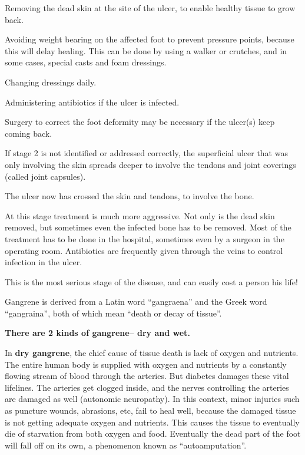 {\item Removing the dead skin at the site of the ulcer, to enable healthy tissue to grow back.

 \item Avoiding weight bearing on the affected foot to prevent pressure points, because this will delay healing. This can be done by using a walker or crutches, and in some cases, special casts and foam dressings.

 \item Changing dressings daily.

 \item Administering antibiotics if the ulcer is infected.

 \item Surgery to correct the foot deformity may be necessary if the ulcer(s) keep coming back.


If stage 2 is not identified or addressed correctly, the superficial ulcer that was only involving the skin spreads deeper to involve the tendons and joint coverings (called joint capsules).


The ulcer now has crossed the skin and tendons, to involve the bone.

At this stage treatment is much more aggressive. Not only is the dead skin removed, but sometimes even the infected bone has to be removed. Most of the treatment has to be done in the hospital, sometimes even by a surgeon in the operating room. Antibiotics are frequently given through the veins to control infection in the ulcer.


This is the most serious stage of the disease, and can easily cost a person his life!

Gangrene is derived from a Latin word “gangraena” and the Greek word “gangraina”, both of which mean “death or decay of tissue”.

\textbf{There are 2 kinds of gangrene– dry and wet.}

In \textbf{dry gangrene}, the chief cause of tissue death is lack of oxygen and nutrients. The entire human body is supplied with oxygen and nutrients by a constantly flowing stream of blood through the arteries. But diabetes damages these vital lifelines. The arteries get clogged inside, and the nerves controlling the arteries are damaged as well (autonomic neuropathy). In this context, minor injuries such as puncture wounds, abrasions, etc, fail to heal well, because the damaged tissue is not getting adequate oxygen and nutrients. This causes the tissue to eventually die of starvation from both oxygen and food. Eventually the dead part of the foot will fall off on its own, a phenomenon known as “autoamputation”.

}
